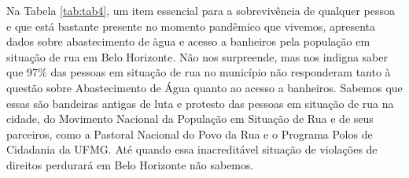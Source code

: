 \documentclass[12pt]{article}
\begin{document}
Na Tabela \ref{tab:tab4}, um item essencial para a sobrevivência de qualquer pessoa e que está bastante presente no momento pandêmico que vivemos, apresenta dados sobre abastecimento de àgua e acesso a banheiros pela população em situação de rua em Belo Horizonte. Não nos surpreende, mas nos indigna saber que 97\% das pessoas em situação de rua no município não responderam tanto à questão sobre Abastecimento de Água quanto ao acesso a banheiros. Sabemos que essas são bandeiras antigas de luta e protesto das pessoas em situação de rua na cidade, do Movimento Nacional da População em Situação de Rua e de seus parceiros, como a Pastoral Nacional do Povo da Rua e o Programa Polos de Cidadania da UFMG. Até quando essa inacreditável situação de violações de direitos perdurará em Belo Horizonte não sabemos.\\
\end{document}

